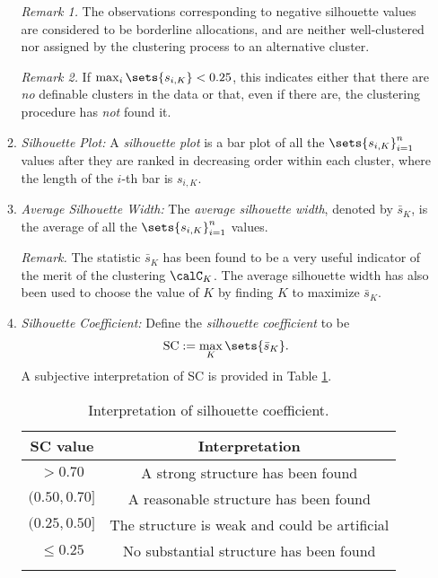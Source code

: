 \documentclass[12pt]{article}
\begin{document}
\begin{enumerate}[label=\textbf{\arabic*.}]
\begin{enumerate}
		\textit{Remark 1.} The observations corresponding to negative silhouette values are considered to be borderline allocations, and are neither well-clustered nor assigned by the clustering process to an alternative cluster. 
		
		\textit{Remark 2.} If $\max_i \sets{s_{i,K}} < 0.25$, this indicates either that there are \emph{no} definable clusters in the data or that, even if there are, the clustering procedure has \emph{not} found it. 
		
		\item \textit{Silhouette Plot:} A \emph{silhouette plot} is a bar plot of all the $\sets{s_{i,K}}_{i=1}^n$ values after they are ranked in decreasing order within each cluster, where the length of the $i$-th bar is $s_{i,K}$. 
		
		\item \textit{Average Silhouette Width:} The \emph{average silhouette width}, denoted by $\bar{s}_K$, is the average of all the $\sets{s_{i,K}}_{i=1}^n$ values. 
		
		\textit{Remark.} The statistic $\bar{s}_K$ has been found to be a very useful indicator of the merit of the clustering $\calC_K$. The average silhouette width has also been used to choose the value of $K$ by finding $K$ to maximize $\bar{s}_K$. 
		
		\item \textit{Silhouette Coefficient:} Define the \emph{silhouette coefficient} to be 
		\begin{align*}
			\mathrm{SC} := \max_K \sets{\bar{s}_K}. 
		\end{align*}
		A subjective interpretation of SC is provided in Table \ref{table-interpretation-sc}. 
		
		\begin{table}[h!]
		\centering
			\begin{tabular}{cc}
				\toprule 
				SC value & Interpretation \\ 
				\midrule 
				$> 0.70$ & A strong structure has been found \\ 
				$(0.50, 0.70]$ & A reasonable structure has been found \\ 
				$(0.25, 0.50]$ & The structure is weak and could be artificial \\ 
				$\le 0.25$ & No substantial structure has been found \\ 
				\bottomrule \\
			\end{tabular}
			\caption{Interpretation of silhouette coefficient.}
			\label{table-interpretation-sc}
		\end{table}
		
	\end{enumerate}

\end{enumerate}
\end{document}
